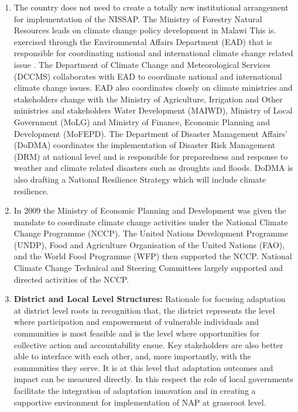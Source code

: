 \documentclass[
]{book}
\begin{document}
\begin{enumerate}
\def\labelenumi{\arabic{enumi}.}
\setcounter{enumi}{25}
\item
  The country does not need to create a totally new institutional arrangement for implementation of the NISSAP. The Ministry of Forestry Natural Resources leads on climate change policy development in Malawi This is. exercised through the Environmental Affairs Department (EAD) that is responsible for coordinating national and international climate change related issue . The Department of Climate Change and Meteorological Services (DCCMS) collaborates with EAD to coordinate national and international climate change issues. EAD also coordinates closely on climate ministries and stakeholders change with the Ministry of Agriculture, Irrigation and Other ministries and stakeholders Water Development (MAIWD), Ministry of Local Government (MoLG) and Ministry of Finance, Economic Planning and Development (MoFEPD). The Department of Disaster Management Affairs' (DoDMA) coordinates the implementation of Disaster Risk Management (DRM) at national level and is responsible for preparedness and response to weather and climate related disasters such as droughts and floods. DoDMA is also drafting a National Resilience Strategy which will include climate resilience.
\item
  In 2009 the Ministry of Economic Planning and Development was given the mandate to coordinate climate change activities under the National Climate Change Programme (NCCP). The United Nations Development Programme (UNDP), Food and Agriculture Organisation of the United Nations (FAO), and the World Food Programme (WFP) then supported the NCCP. National Climate Change Technical and Steering Committees largely supported and directed activities of the NCCP.
\item
  \textbf{District and Local Level Structures:} Rationale for focusing adaptation at district level roots in recognition that, the district represents the level where participation and empowerment of vulnerable individuals and communities is most feasible and is the level where opportunities for collective action and accountability ensue. Key stakeholders are also better able to interface with each other, and, more importantly, with the communities they serve. It is at this level that adaptation outcomes and impact can be measured directly. In this respect the role of local governments facilitate the integration of adaptation innovation and in creating a supportive environment for implementation of NAP at grassroot level.

\end{enumerate}
\end{document}
